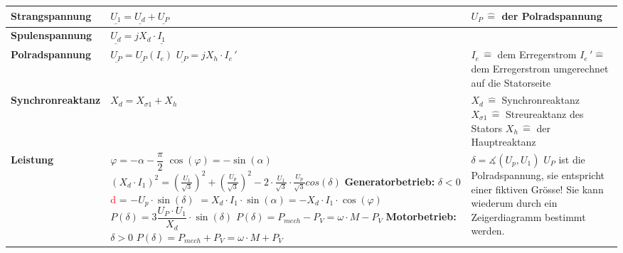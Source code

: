     \begin{tabular}[b]{| C{5cm}| P{8.5cm} | P{5 cm} |}
    	\hline
        \textbf{Strangspannung} 	&
        $\underline{U_1\!} = \underline{U_d\!} + \underline{U_P\!}$ &
        $U_P \, \widehat{=}$ der Polradspannung
        \\ \hline
        
        \textbf{Spulenspannung}	&
        $\underline{U_d} = jX_d\cdot \underline{I_1}$ &
        \\ \hline
        
        \textbf{Polradspannung} &
        $\underline{U_P} = \underline{U_P}\left(I_e\right)$ \newline\newline
        $\underline{U_P} = jX_h\cdot I_{e}\,'$  &
        $I_e \, \widehat{=}$ dem Erregerstrom \newline
        $I_e\,' \widehat{=}$ dem Erregerstrom umgerechnet auf die Statorseite
        \\ \hline
        
        \textbf{Synchronreaktanz} &
        $X_d = X_{\sigma 1} + X_h$ &
        $X_d \, \widehat{=} $ Synchronreaktanz \newline
        $X_{\sigma 1} \, \widehat{=}$ Streureaktanz des Stators \newline
        $X_h \, \widehat{=}$ der Hauptreaktanz
        \\ \hline
        
        \textbf{Leistung} \newline
         &
        $\varphi = -\alpha - \dfrac{\pi}{2}$ \newline
        $\cos(\varphi) = -\sin(\alpha)$ \newline
       	$ (X_d \cdot I_1)^2=(\frac{U_1}{\sqrt{3}})^2+(\frac{U_p}{\sqrt{3}})^2 - 2\cdot \frac{U_1}{\sqrt{3}}\cdot \frac{U_p}{\sqrt{3}} cos(\delta) $ \newline\newline
        \textbf{Generatorbetrieb:} $\delta < 0$ \newline
        \textcolor{red}{d} = $-U_p\cdot\sin(\delta)$ \newline
        \qquad $= X_d\cdot I_1\cdot\sin(\alpha) = -X_d\cdot I_1\cdot\cos(\varphi)$ \newline \newline
        $P(\delta) = 3\dfrac{U_P\cdot U_1}{X_d}\cdot\sin(\delta)$ \newline \newline
        $P(\delta) = P_{mech}-P_V = \omega\cdot M - P_V$ \newline \newline
        \textbf{Motorbetrieb:} $\delta > 0$ \newline
        $P(\delta) = P_{mech} + P_V = \omega\cdot M + P_V$ &
        $\delta =  \measuredangle (U_p, U_1)$ \newline \newline
        $U_P$ ist die Polradspannung, sie entspricht einer fiktiven Grösse! Sie kann wiederum durch ein Zeigerdiagramm bestimmt werden.
        \\ \hline
    \end{tabular}
